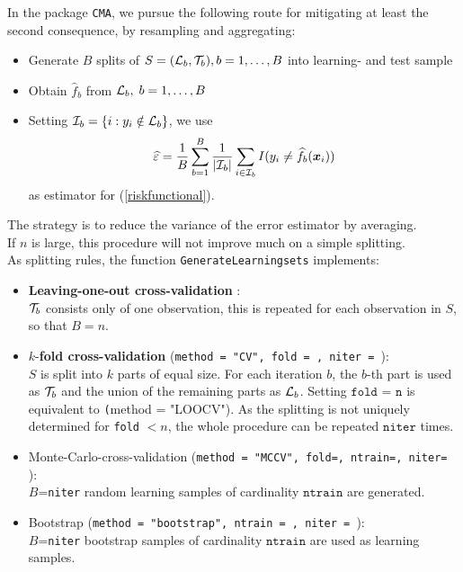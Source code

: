 In the package \texttt{CMA}, we pursue the following route for mitigating at least
the second consequence, by resampling and aggregating:
\begin{itemize}
\item Generate $B$ splits of $S = (\mathcal L_b, \mathcal T_b), b=1,\ldots,B$
      into learning- and test sample
\item Obtain $\widehat{f}_b$ from $\mathcal L_b, \; b=1,\ldots,B$
\item Setting  $\mathcal I_b = \{i: y_i \notin \mathcal L_b \}$, we use
      \begin{equation}\label{errorglobal}
      \widehat\varepsilon = \frac{1}{B} \sum_{b=1}^B \frac{1}{|\mathcal{I}_b|}
                                     \sum_{i \in \mathcal{I}_b} I(y_i \neq \widehat{f}_b(\bm{x}_i))
      \end{equation}
      as estimator for (\ref{riskfunctional}).                                 
\end{itemize}
The strategy is to reduce the variance of the error estimator by averaging.\\
If $n$ is large, this procedure will not improve much on a simple splitting.\\
As splitting rules, the function \texttt{GenerateLearningsets} implements:
\begin{itemize}
\item \textbf{Leaving-one-out cross-validation} :\\
      $\mathcal T_b$ consists only of one observation, this is repeated
      for each observation in $S$, so that $B = n$.
\item $k$-\textbf{fold cross-validation} (\texttt{method = "CV", fold = , niter = }):\\
      $S$ is split into $k$ parts of equal size. For each iteration $b$,
      the $b$-th part is used as $\mathcal T_b$ and the union of the remaining
      parts as $\mathcal L_b$. Setting $\texttt{fold = n}$ 
      is equivalent to \texttt(method = "LOOCV"). 
      As the splitting is not uniquely determined for \texttt{fold} $< n$,
      the whole procedure can be repeated $\texttt{niter}$ times. 
\item Monte-Carlo-cross-validation (\texttt{method = "MCCV", fold=, ntrain=, niter= }):\\
      $B$=\texttt{niter} random learning samples of cardinality $\texttt{ntrain}$
      are generated.     
\item Bootstrap (\texttt{method = "bootstrap",  ntrain = , niter = }):\\
      $B$=\texttt{niter} bootstrap samples of cardinality $\texttt{ntrain}$ are 
      used as learning samples. 
\end{itemize}
